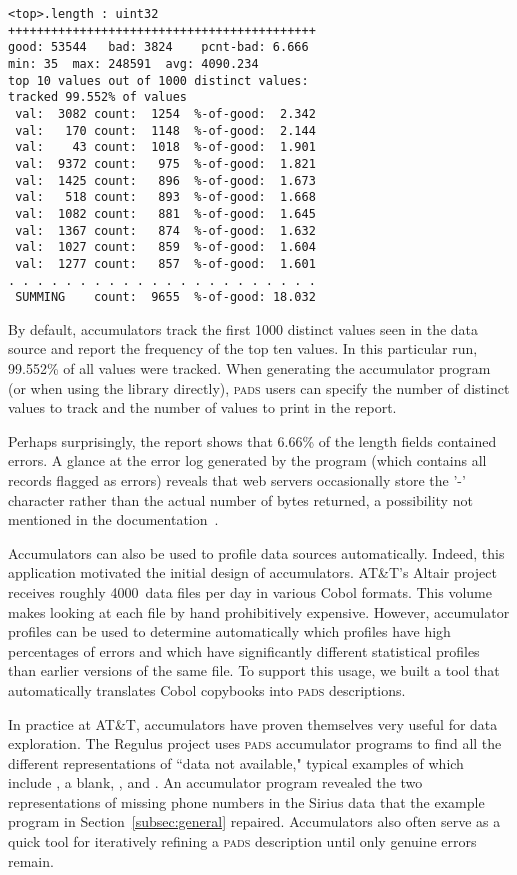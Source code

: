 \documentclass{sigplanconf}
\newcommand{\dibbler}{Sirius}
\newcommand{\ningaui}{Altair}
\newcommand{\darkstar}{Regulus}
\newcommand{\secref}[1]{Section~\ref{#1}}
\newcommand{\pads}{\textsc{pads}}
\begin{document}
\begin{small}
\begin{verbatim}
<top>.length : uint32
+++++++++++++++++++++++++++++++++++++++++++
good: 53544   bad: 3824    pcnt-bad: 6.666
min: 35  max: 248591  avg: 4090.234
top 10 values out of 1000 distinct values:
tracked 99.552% of values
 val:  3082 count:  1254  %-of-good:  2.342
 val:   170 count:  1148  %-of-good:  2.144
 val:    43 count:  1018  %-of-good:  1.901
 val:  9372 count:   975  %-of-good:  1.821
 val:  1425 count:   896  %-of-good:  1.673
 val:   518 count:   893  %-of-good:  1.668
 val:  1082 count:   881  %-of-good:  1.645
 val:  1367 count:   874  %-of-good:  1.632
 val:  1027 count:   859  %-of-good:  1.604
 val:  1277 count:   857  %-of-good:  1.601
. . . . . . . . . . . . . . . . . . . . . . 
 SUMMING    count:  9655  %-of-good: 18.032
\end{verbatim}
\end{small}
%
By default, accumulators track the first 1000 distinct
values seen in the data source and report the frequency
of the top ten values.  In this particular run, 99.552\%
of all values were tracked.  When generating the accumulator
program (or when using the library directly), \pads{} users can specify 
the number of distinct values to track and the number 
of values to print in the report.

Perhaps surprisingly, the report shows that 6.66\% of the length
fields contained errors.  A glance at the error log generated
by the program (which contains all records flagged as errors) 
reveals that web servers occasionally store the '-' character
rather than the actual number of bytes returned, a possibility
not mentioned in the documentation~\cite{wpp}.

Accumulators can also be used to profile data sources automatically.
Indeed, this application motivated the initial design of accumulators.
AT\&T's \ningaui{} project receives roughly 4000~data files per day in various
Cobol formats.  This volume makes looking at each file by hand 
prohibitively expensive.  However, accumulator profiles can be used to 
determine automatically
which profiles have high percentages of errors and which have significantly
different statistical profiles than earlier versions of the same file.  
To support this usage, we built a tool that automatically translates
Cobol copybooks into \pads{} descriptions.

In practice at AT\&T, accumulators have proven themselves very useful for
data exploration.  The \darkstar{} project uses \pads{} accumulator programs
to find all the different representations of ``data not available,"  typical 
examples of which include , a blank, , and .
An accumulator program revealed the two representations
of missing phone numbers in the \dibbler{} data that the example program
in \secref{subsec:general} repaired.
Accumulators also often serve as a quick tool for iteratively
refining a \pads{} description until only genuine errors remain.
\end{document}
